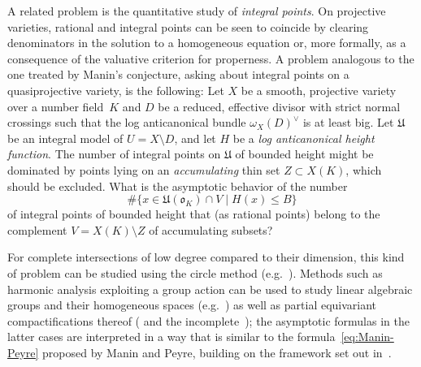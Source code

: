 \documentclass[a4paper, twoside, 10pt]{amsart}
\newcommand{\mU}{\mathfrak{U}}
\newcommand{\fo}{\mathfrak{o}}
\theoremstyle{definition}
\begin{document}
\medskip

A related problem is the quantitative study of \emph{integral points}. On projective varieties, rational and integral points can be seen to coincide by clearing denominators in the solution to a homogeneous equation or, more formally, as a consequence of the valuative criterion for properness. A problem analogous to the one treated by Manin's conjecture, asking about integral points on a quasiprojective variety, is the following: Let $X$ be a smooth, projective variety over a number field~$K$ and $D$ be a reduced, effective divisor with strict normal crossings such that the log anticanonical bundle $\omega_X(D)^\vee$ is at least big. Let $\mU$ be an integral model of $U=X \setminus D$, and let $H$ be a \emph{log anticanonical height function}. The number of integral points on $\mU$ of bounded height might be dominated by points lying on an \emph{accumulating} thin set $Z\subset X(K)$, which should be excluded. What is the asymptotic behavior of the number
\begin{equation}\label{eq:integral-count-general}
  \#\{x\in \mU(\fo_K) \cap V \mid H(x)\le B\}
\end{equation}
of integral points of bounded height that (as rational points) belong to the complement $V = X(K)\setminus Z$ of accumulating subsets? 

For complete intersections of low degree compared to their dimension, this kind of problem can be studied using the circle method (e.g.~\cite{MR0150129,MR781588}). Methods such as harmonic analysis exploiting a group action can be used to study linear algebraic groups and their homogeneous spaces (e.g.~\cite{MR1230289,MR1230290,MR1381987,MR2286635,MR2488484}) as well as partial equivariant compactifications thereof (\cite{MR2999313,MR3117310} and the incomplete~\cite{arXiv:1006.3345}); the asymptotic formulas in the latter cases are interpreted in a way that is similar to the formula~\eqref{eq:Manin-Peyre} proposed by Manin and Peyre, building on the framework set out in~\cite{MR2740045}. 
\end{document}
